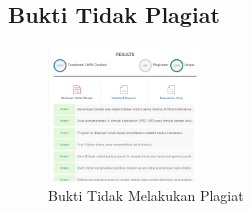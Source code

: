 \subsection{Bukti Tidak Plagiat}
\begin{figure}[H]
	\includegraphics[width=4cm]{figures/1174026/1/plagiat.PNG}
	\centering
	\caption{Bukti Tidak Melakukan Plagiat }
\end{figure}
